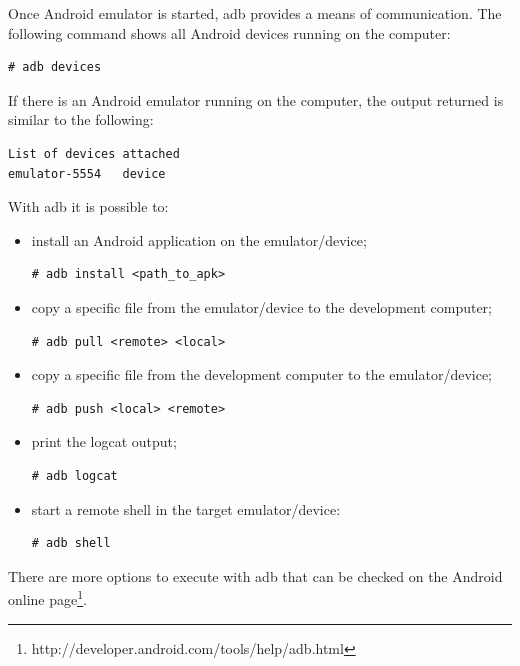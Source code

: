 Once Android emulator is started, adb provides a means of communication. The following command shows all Android devices running on the computer:

 \begin{lstlisting}[caption=Command to show Android devices running on the computer]
# adb devices
\end{lstlisting}

If there is an Android emulator running on the computer, the output returned is similar to the following:

 \begin{lstlisting}[caption=Example of the output from the \texttt{adb devices} command]
List of devices attached 
emulator-5554	device
\end{lstlisting}

With adb it is possible to:

\begin{itemize}

\item install an Android application on the emulator/device;
 \begin{lstlisting}[caption=Command to install Android apps using the adb utility]
# adb install <path_to_apk>
\end{lstlisting}

\item copy a specific file from the emulator/device to the development computer;
 \begin{lstlisting}[caption=Command to pull files using the adb utility]
# adb pull <remote> <local>
\end{lstlisting}

\item copy a specific file from the development computer to the emulator/device;
 \begin{lstlisting}[caption=Command to push files using the adb utility]
# adb push <local> <remote>
\end{lstlisting}

\item print the logcat output;
 \begin{lstlisting}[caption=Command to get logcat's prints using the adb utility]
# adb logcat
\end{lstlisting}

\item start a remote shell in the target emulator/device:
 \begin{lstlisting}[caption=Command to start a remote shell using the adb utility]
# adb shell
\end{lstlisting}

\end{itemize}

There are more options to execute with adb that can be checked on the Android online page\footnote{http://developer.android.com/tools/help/adb.html}.